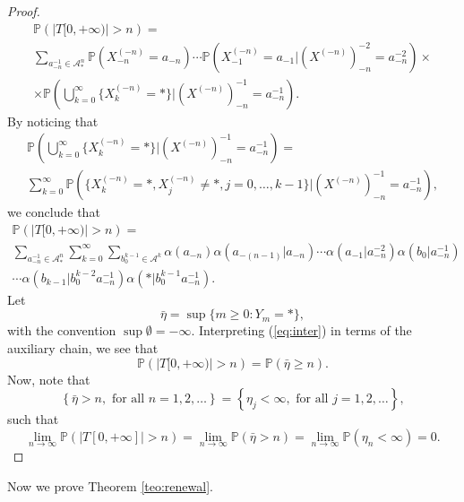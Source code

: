 \documentclass[a4paper]{article}
\def\P{{\mathbb P}}
\newcommand{\A}{\mathcal{A}}
\begin{document}
\begin{proof}
\begin{multline*}
\P(|T[0,+\infty) |>n)= \\
\sum_{a_{-n}^{-1}\in \A_*^n}\P(X_{-n}^{(-n)}=a_{-n})%
\cdots \P(X_{-1}^{(-n)}=a_{-1}|(X^{(-n)})_{-n}^{-2}=a_{-n}^{-2}) \times \\
\times \P\left(\bigcup_{k=0}^{\infty}\{X_{k}^{(-n)}=*\} |(X^{(-n)})_{-n}^{-1}=a_{-n}^{-1}\right).
\end{multline*}
By noticing that
\begin{multline*}
\P\left(\bigcup_{k=0}^{\infty}\{X_{k}^{(-n)}=*\} |(X^{(-n)})_{-n}^{-1}=a_{-n}^{-1}\right)= \\ 
\sum_{k=0}^{\infty}\P\left(\{X_{k}^{(-n)}=*,X_{j}^{(-n)}\neq *, j=0,\ldots,k-1\} |(X^{(-n)})_{-n}^{-1}=a_{-n}^{-1}\right),
\end{multline*}
we conclude that
\begin{multline}\label{eq:inter}
\P(|T[0,+\infty)|>n)=\\
\sum_{a_{-n}^{-1}\in \A_*^n}\sum_{k=0}^{\infty}\sum_{b_{0}^{k-1}\in \A^k}
\alpha(a_{-n})\alpha(a_{-(n-1)}|a_{-n})\cdots \alpha(a_{-1}|a_{-n}^{-2})\alpha(b_0|a_{-n}^{-1})\\
\cdots \alpha(b_{k-1}|b_0^{k-2}a_{-n}^{-1})\alpha(*|b_0^{k-1}a_{-n}^{-1}) . 
\end{multline}
Let
$$
\bar{\eta}=\sup\{m\geq 0:Y_m=*\},
$$
with the convention $\sup \emptyset =-\infty$. Interpreting (\ref{eq:inter}) in terms of the auxiliary chain, we see that 
$$
\P(|T[0,+\infty)|>n)=\P(\bar{\eta} \geq n).
$$
Now, note that
$$
\left\{\bar{\eta}>n, \text{ for all } n=1,2,\ldots \right\}=\left\{\eta_j<\infty, \text{ for all } j=1,2,\ldots \right\},
$$
such that
$$
\lim_{n\to \infty}\P(|T[0,+\infty]|>n)=\lim_{n\to \infty}\P(\bar{\eta} >n) =\lim_{n\to \infty}\P(\eta_n <\infty)=0.
$$

\end{proof}

Now we prove Theorem \ref{teo:renewal}.
\end{document}
